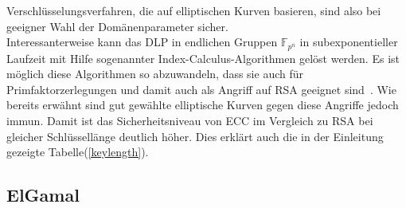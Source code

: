 \documentclass[hidelinks]{article}
\theoremstyle{plain}
\theoremstyle{definition}
\theoremstyle{rem}
\begin{document}
\begin{sloppypar}
Verschlüsselungsverfahren, die auf elliptischen Kurven basieren, sind also bei geeigner Wahl der Domänenparameter sicher. \\
\newline
Interessanterweise kann das DLP in endlichen Gruppen $\mathbb{F}_{p^n}$ in subexponentieller Laufzeit mit Hilfe sogenannter Index-Calculus-Algorithmen gelöst werden. Es ist möglich diese Algorithmen so abzuwandeln, dass sie auch für Primfaktorzerlegungen und damit auch als Angriff auf RSA geeignet sind~\cite{joux2014}.
Wie bereits erwähnt sind gut gewählte elliptische Kurven gegen diese Angriffe jedoch immun.
Damit ist das Sicherheitsniveau von ECC im Vergleich zu
RSA bei gleicher Schlüssellänge deutlich höher. Dies erklärt auch die in der Einleitung gezeigte Tabelle(\ref{keylength}).

\subsection{ElGamal}

\end{sloppypar}
\end{document}
